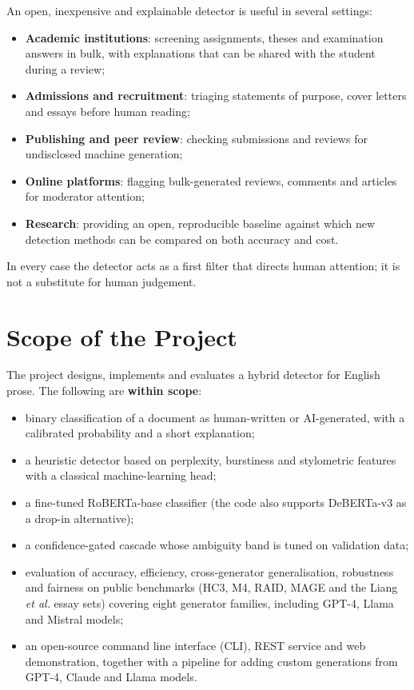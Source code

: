 An open, inexpensive and explainable detector is useful in several settings:
\begin{itemize}
  \item \textbf{Academic institutions}: screening assignments, theses and
        examination answers in bulk, with explanations that can be shared
        with the student during a review;
  \item \textbf{Admissions and recruitment}: triaging statements of purpose,
        cover letters and essays before human reading;
  \item \textbf{Publishing and peer review}: checking submissions and reviews
        for undisclosed machine generation;
  \item \textbf{Online platforms}: flagging bulk-generated reviews, comments
        and articles for moderator attention;
  \item \textbf{Research}: providing an open, reproducible baseline against
        which new detection methods can be compared on both accuracy and cost.
\end{itemize}
In every case the detector acts as a first filter that directs human
attention; it is not a substitute for human judgement.

\section{Scope of the Project}

The project designs, implements and evaluates a hybrid detector for English
prose. The following are \textbf{within scope}:
\begin{itemize}
  \item binary classification of a document as human-written or AI-generated,
        with a calibrated probability and a short explanation;
  \item a heuristic detector based on perplexity, burstiness and stylometric
        features with a classical machine-learning head;
  \item a fine-tuned RoBERTa-base classifier (the code also supports DeBERTa-v3
        as a drop-in alternative);
  \item a confidence-gated cascade whose ambiguity band is tuned on validation
        data;
  \item evaluation of accuracy, efficiency, cross-generator generalisation,
        robustness and fairness on public benchmarks (HC3, M4, RAID, MAGE and
        the Liang \textit{et al.} essay sets) covering eight generator
        families, including GPT-4, Llama and Mistral models;
  \item an open-source command line interface (CLI), REST service and web
        demonstration, together with a pipeline for adding custom generations
        from GPT-4, Claude and Llama models.
\end{itemize}

